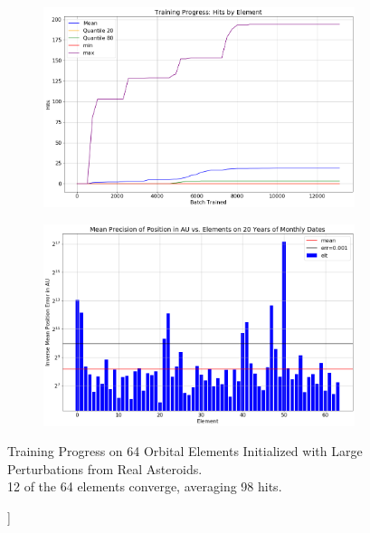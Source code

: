 \begin{figure}[h]
\begin{subfigure}[t]{\subfigwidth\textwidth}
\end{subfigure}
\hfill
\begin{subfigure}[t]{\subfigwidth\textwidth}
\centering
\includegraphics[width=\linewidth]{../figs/search_known/perturbed_large/learning_curve_hits.png}
\end{subfigure}
\medskip
\begin{subfigure}[t]{\textwidth}
\includegraphics[width=1.0\textwidth]{../figs/search_known/perturbed_large/near_ast_dist.png}
\end{subfigure}
\caption[Training Progress on 64 Orbital Elements Initialized with Large Perturbations]]
{Training Progress on 64 Orbital Elements Initialized with Large Perturbations from Real Asteroids.\\
12 of the 64 elements converge, averaging 98 hits.}
\end{figure}
\clearpage

